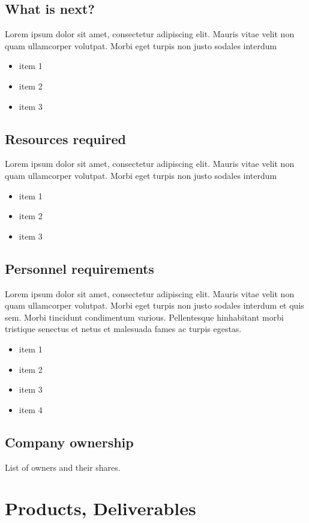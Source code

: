 \documentclass[11pt]{article}
\begin{document}
\subsection{What is next?}
Lorem ipsum dolor sit amet, consectetur adipiscing elit. Mauris vitae velit
non quam ullamcorper volutpat. Morbi eget turpis non justo sodales interdum
\newline
\begin{itemize}
\item item 1
\item item 2
\item item 3
\end{itemize}

\subsection{Resources required}
Lorem ipsum dolor sit amet, consectetur adipiscing elit. Mauris vitae velit
non quam ullamcorper volutpat. Morbi eget turpis non justo sodales interdum
\newline
\begin{itemize}
\item item 1
\item item 2
\item item 3
\end{itemize}

\subsection{Personnel requirements}
Lorem ipsum dolor sit amet, consectetur adipiscing elit. Mauris vitae velit
non quam ullamcorper volutpat. Morbi eget turpis non justo sodales interdum
et quis sem. Morbi tincidunt condimentum various. Pellentesque hinhabitant morbi
tristique senectus et netus et malesuada fames ac turpis egestas.\newline
\begin{itemize}
\item item 1
\item item 2
\item item 3
\item item 4
\end{itemize}

\subsection{Company ownership}
List of owners and their shares.
\pagebreak


\section{Products, Deliverables}
\end{document}
